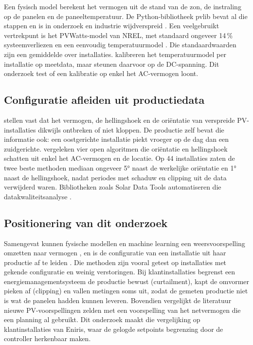 Een fysisch model berekent het vermogen uit de stand van de zon, de instraling op de panelen en de paneeltemperatuur. De Python-bibliotheek pvlib bevat al die stappen en is in onderzoek en industrie wijdverspreid \autocite{Anderson2023}. Een veelgebruikt vertrekpunt is het PVWatts-model van NREL, met standaard ongeveer 14\,\% systeemverliezen en een eenvoudig temperatuurmodel \autocite{Dobos2014}. Die standaardwaarden zijn een gemiddelde over installaties. \textcite{Kladas2023} kalibreren het temperatuurmodel per installatie op meetdata, maar steunen daarvoor op de DC-spanning. Dit onderzoek test of een kalibratie op enkel het AC-vermogen loont.

\subsection{Configuratie afleiden uit productiedata}

\textcite{Lingfors2025} stellen vast dat het vermogen, de hellingshoek en de oriëntatie van verspreide PV-installaties dikwijls ontbreken of niet kloppen. De productie zelf bevat die informatie ook: een oostgerichte installatie piekt vroeger op de dag dan een zuidgerichte. \textcite{Perry2023} vergeleken vier open algoritmen die oriëntatie en hellingshoek schatten uit enkel het AC-vermogen en de locatie. Op 44 installaties zaten de twee beste methoden mediaan ongeveer 5° naast de werkelijke oriëntatie en 1° naast de hellingshoek, nadat periodes met schaduw en clipping uit de data verwijderd waren. Bibliotheken zoals Solar Data Tools automatiseren die datakwaliteitsanalyse \autocite{Miskovich2025}.

\subsection{Positionering van dit onderzoek}

Samengevat kunnen fysische modellen en machine learning een weersvoorspelling omzetten naar vermogen \autocite{Anderson2023,Gaboitaolelwe2023}, en is de configuratie van een installatie uit haar productie af te leiden \autocite{Perry2023}. Die methoden zijn vooral getest op installaties met gekende configuratie en weinig verstoringen. Bij klantinstallaties begrenst een energiemanagementsysteem de productie bewust (curtailment), kapt de omvormer pieken af (clipping) en vallen metingen soms uit, zodat de gemeten productie niet is wat de panelen hadden kunnen leveren. Bovendien vergelijkt de literatuur nieuwe PV-voorspellingen zelden met een voorspelling van het netvermogen die een planning al gebruikt. Dit onderzoek maakt die vergelijking op klantinstallaties van Eniris, waar de gelogde setpoints begrenzing door de controller herkenbaar maken.

